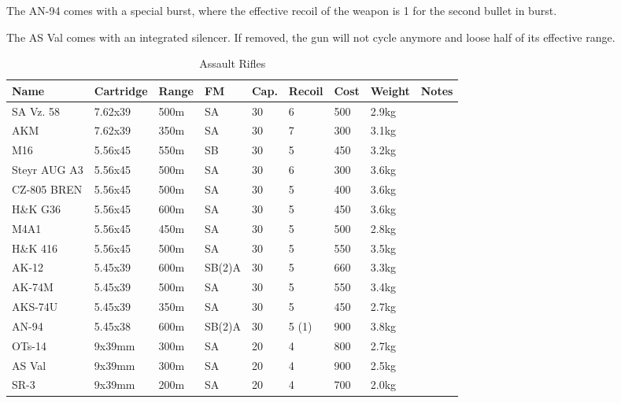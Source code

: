The AN-94 comes with a special burst, where the effective recoil of the weapon
is 1 for the second bullet in burst.

The AS Val comes with an integrated silencer. If removed, the gun will not
cycle anymore and loose half of its effective range.

\begin{table}
  \caption{Assault Rifles}
  \label{tab:AssaultRifles}
  \begin{center}
    \begin{tabular}{| l | l | l | l | l | l | l | l | l |}
      \hline
      \textbf{Name} & \textbf{Cartridge} & \textbf{Range} &
      \textbf{FM} & \textbf{Cap.} & \textbf{Recoil} &
      \textbf{Cost} & \textbf{Weight} & \textbf{Notes} \\ \hline

      SA Vz. 58    & 7.62x39 & 500m & SA  & 30 & 6 & 500 & 2.9kg & \\ \hline
      AKM          & 7.62x39 & 350m & SA  & 30 & 7 & 300 & 3.1kg & \\ \hline

      M16          & 5.56x45 & 550m & SB  & 30 & 5 & 450 & 3.2kg & \\ \hline
      Steyr AUG A3 & 5.56x45 & 500m & SA  & 30 & 6 & 300 & 3.6kg & \\ \hline
      CZ-805 BREN  & 5.56x45 & 500m & SA  & 30 & 5 & 400 & 3.6kg & \\ \hline
      H\&K G36     & 5.56x45 & 600m & SA  & 30 & 5 & 450 & 3.6kg & \\ \hline
      M4A1         & 5.56x45 & 450m & SA  & 30 & 5 & 500 & 2.8kg & \\ \hline
      H\&K 416     & 5.56x45 & 500m & SA  & 30 & 5 & 550 & 3.5kg & \\ \hline

      AK-12        & 5.45x39 & 600m & SB(2)A & 30 & 5 & 660 & 3.3kg & \\ \hline
      AK-74M       & 5.45x39 & 500m & SA     & 30 & 5 & 550 & 3.4kg & \\ \hline
      AKS-74U      & 5.45x39 & 350m & SA     & 30 & 5 & 450 & 2.7kg & \\ \hline
      AN-94        & 5.45x38 & 600m & SB(2)A & 30 & 5 (1) & 900 & 3.8kg & \\ \hline

      OTs-14       & 9x39mm  & 300m & SA     & 20 & 4 & 800 & 2.7kg & \\ \hline
      AS Val       & 9x39mm  & 300m & SA     & 20 & 4 & 900 & 2.5kg & \\ \hline
      SR-3         & 9x39mm  & 200m & SA     & 20 & 4 & 700 & 2.0kg & \\ \hline

    \end{tabular}
  \end{center}
\end{table}


